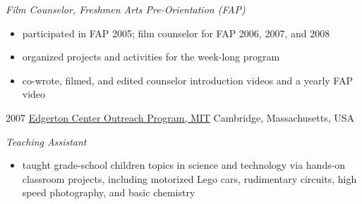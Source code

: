\documentclass[10pt, a4]{friggeri-cv}
\begin{document}
\begin{entrylist}
	{\emph{Film Counselor, Freshmen Arts Pre-Orientation (FAP)}
	\begin{itemize}
		\item participated in FAP 2005; film counselor for FAP 2006, 2007, and 2008
		\item organized projects and activities for the week-long program
		\item co-wrote, filmed, and edited counselor introduction videos and a yearly FAP video
	\end{itemize}
	}
  \entry
	{2007}
	{\href{http://edgerton.mit.edu/outreach}{Edgerton Center Outreach Program, MIT}}
	{Cambridge, Massachusetts, USA}
	{\emph{Teaching Assistant} 
	\begin{itemize}
		\item taught grade-school children topics in science and technology via hands-on classroom projects, including motorized Lego cars, rudimentary circuits, high speed photography, and basic chemistry
	\end{itemize}
	}
\end{entrylist}
\end{document}
